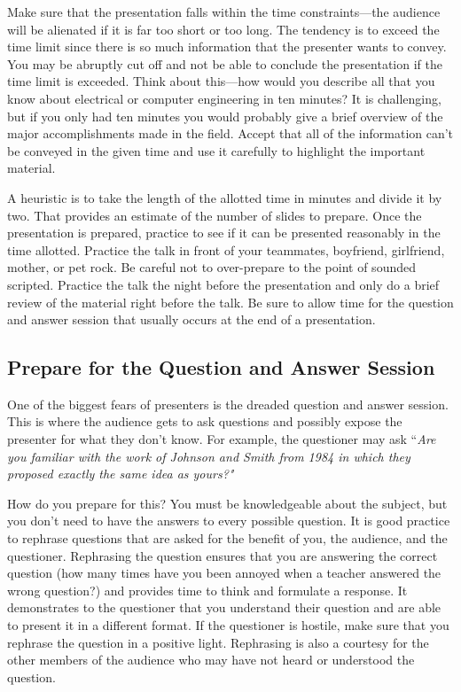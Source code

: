 Make sure that the presentation falls within the time constraints---the
audience will be alienated if it is far too short or too long. The
tendency is to exceed the time limit since there is so much information
that the presenter wants to convey. You may be abruptly cut off and not
be able to conclude the presentation if the time limit is exceeded.
Think about this---how would you describe all that you know about
electrical or computer engineering in ten minutes? It is challenging,
but if you only had ten minutes you would probably give a brief overview
of the major accomplishments made in the field. Accept that all of the
information can't be conveyed in the given time and use it carefully to
highlight the important material.

A heuristic is to take the length of the allotted time in minutes and
divide it by two. That provides an estimate of the number of slides to
prepare. Once the presentation is prepared, practice to see if it can be
presented reasonably in the time allotted. Practice the talk in front of
your teammates, boyfriend, girlfriend, mother, or pet rock. Be careful
not to over-prepare to the point of sounded scripted. Practice the talk
the night before the presentation and only do a brief review of the
material right before the talk. Be sure to allow time for the question
and answer session that usually occurs at the end of a presentation.

\subsection*{Prepare for the Question and Answer Session}
\label{subsection:prepare-for-the-question-and-answer-session}

One of the biggest fears of presenters is the dreaded question and
answer session. This is where the audience gets to ask questions and
possibly expose the presenter for what they don't know. For example, the
questioner may ask ``\emph{Are you familiar with the work of Johnson and
Smith from 1984 in which they proposed exactly the same idea as yours?"}

How do you prepare for this? You must be knowledgeable about the
subject, but you don't need to have the answers to every possible
question. It is good practice to rephrase questions that are asked for
the benefit of you, the audience, and the questioner. Rephrasing the
question ensures that you are answering the correct question (how many
times have you been annoyed when a teacher answered the wrong question?)
and provides time to think and formulate a response. It demonstrates to
the questioner that you understand their question and are able to
present it in a different format. If the questioner is hostile, make
sure that you rephrase the question in a positive light. Rephrasing is
also a courtesy for the other members of the audience who may have not
heard or understood the question.

